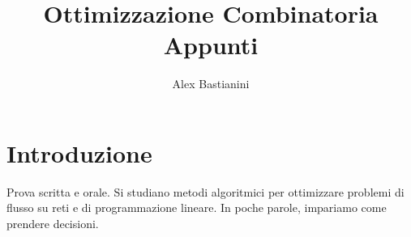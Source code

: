\documentclass{report}
\title{\Huge{Ottimizzazione Combinatoria}\\Appunti}
\author{\huge{Alex Bastianini}}
\date{}
\begin{document}
\maketitle
\newpage%
\tableofcontents

\pagebreak

\chapter{Introduzione}
Prova scritta e orale. Si studiano metodi algoritmici per ottimizzare problemi di flusso su reti e di programmazione lineare. In poche parole, impariamo come prendere decisioni.


\end{document}
